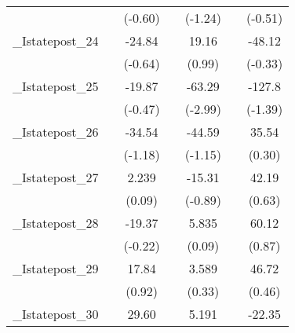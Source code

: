 {\begin{tabular}{l*{6}{c}}
            &                     &     (-0.60)         &                     &     (-1.24)         &                     &     (-0.51)         \\
[1em]
\_Istatepost\_24&                     &      -24.84         &                     &       19.16         &                     &      -48.12         \\
            &                     &     (-0.64)         &                     &      (0.99)         &                     &     (-0.33)         \\
[1em]
\_Istatepost\_25&                     &      -19.87         &                     &      -63.29\sym{**} &                     &      -127.8         \\
            &                     &     (-0.47)         &                     &     (-2.99)         &                     &     (-1.39)         \\
[1em]
\_Istatepost\_26&                     &      -34.54         &                     &      -44.59         &                     &       35.54         \\
            &                     &     (-1.18)         &                     &     (-1.15)         &                     &      (0.30)         \\
[1em]
\_Istatepost\_27&                     &       2.239         &                     &      -15.31         &                     &       42.19         \\
            &                     &      (0.09)         &                     &     (-0.89)         &                     &      (0.63)         \\
[1em]
\_Istatepost\_28&                     &      -19.37         &                     &       5.835         &                     &       60.12         \\
            &                     &     (-0.22)         &                     &      (0.09)         &                     &      (0.87)         \\
[1em]
\_Istatepost\_29&                     &       17.84         &                     &       3.589         &                     &       46.72         \\
            &                     &      (0.92)         &                     &      (0.33)         &                     &      (0.46)         \\
[1em]
\_Istatepost\_30&                     &       29.60         &                     &       5.191         &                     &      -22.35         \\

\end{tabular}}
